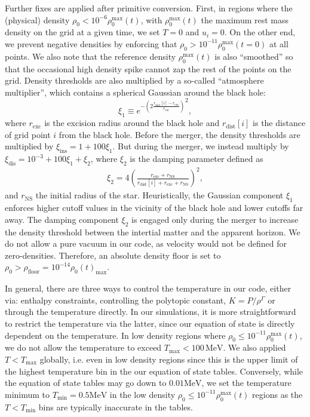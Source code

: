 Further fixes are applied after primitive conversion.
First, in regions where the (physical) density $\rho_0 < 10^{-6} \rho_0^\textrm{max}(t)$, with $\rho_0^\textrm{max}(t)$ the maximum rest mass density on the grid at a given time, we set $T=0$ and $u_i=0$.
On the other end, we prevent negative densities by enforcing that $\rho_0 > 10^{-11} \rho_0^\textrm{max}(t=0)$ at all points.
We also note that the reference density $\rho_0^\textrm{max}(t)$ is also ``smoothed'' so that the occasional high density spike cannot zap the rest of the points on the grid.
Density thresholds are also multiplied by a so-called ``atmosphere multiplier'', which contains a spherical Gaussian around the black hole:
\begin{equation}
\xi_1 \equiv {e^{- \left(2 \frac{ r_\textrm{dist}[i] - r_\textrm{exc}}{r_\textrm{exc}}\right)}}^2 ,
\end{equation}
where $r_\textrm{exc}$ is the excision radius around the black hole and $ r_\textrm{dist}[i]$ is the distance of grid point $i$ from the black hole.
Before the merger, the density thresholds are multiplied by $\xi_\textrm{ins} = 1 + 100 \xi_1$.  But during the merger, we instead multiply by $\xi_\textrm{dis}  = 10^{-3} + 100 \xi_1 + \xi_2$, where $\xi_2$ is the damping parameter defined as
\begin{eqnarray}
\xi_2 = 4 \left( \frac{r_\textrm{exc} + r_\textrm{NS}}
{ r_\textrm{dist}[i] + r_\textrm{exc} + r_\textrm{NS}}\right)^2 , 
\end{eqnarray}
and $ r_\textrm{NS}$ the initial radius of the star.
Heuristically, the Gaussian component $\xi_1$ enforces higher cutoff values in the vicinity of the black hole and lower cutoffs far away.
The damping component $\xi_2$ is engaged only during the merger to increase the density threshold between the intertial matter and the apparent horizon.
We do not allow a pure vacuum in our code, as velocity would not be defined for zero-densities.  Therefore, an absolute density floor is set to $\rho_0 >  \rho_\textrm{floor} = 10^{-14} \rho_0(t)_\textrm{max}$.  

In general, there are three ways to control the temperature in our code, either via: enthalpy constraints, controlling the polytopic constant, $K = P/{\rho^{\Gamma}}$ or through the temperature directly.
In our simulations, it is more straightforward to restrict the temperature via the latter, since our equation of state is directly dependent on the temperature.
In low density regions where $\rho_0 \le 10^{-11} \rho_0^\textrm{max}(t)$, we do not allow the temperature to exceed $T_\textrm{max} < 100\,\textrm{MeV}$.
We also applied $T < T_\textrm{max}$ globally, i.e. even in low density regions since this is the upper limit of the highest temperature bin in the our equation of state tables.  
Conversely, while the equation of state tables may go down to $0.01 \textrm{MeV}$, we set the temperature minimum to $T_\textrm{min} = 0.5 \textrm{MeV}$ in the low density $\rho_0 \le 10^{-11} \rho_0^\textrm{max}(t)$ regions as the $T < T_\textrm{min}$ bins are typically inaccurate in the tables.

